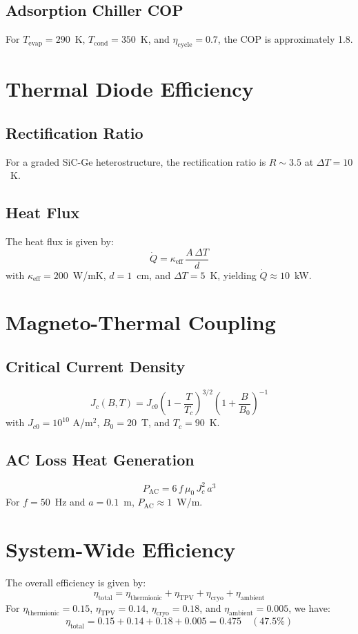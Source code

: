\documentclass[12pt]{article}
\begin{document}
\subsection{Adsorption Chiller COP}
For $T_{\text{evap}} = 290$~K, $T_{\text{cond}} = 350$~K, and $\eta_{\text{cycle}} = 0.7$, the COP is approximately 1.8.

\section{Thermal Diode Efficiency}
\subsection{Rectification Ratio}
For a graded SiC-Ge heterostructure, the rectification ratio is $R \sim 3.5$ at $\Delta T = 10$~K.

\subsection{Heat Flux}
The heat flux is given by:
\begin{equation}
    \dot{Q} = \kappa_{\text{eff}}\,\frac{A\,\Delta T}{d}
\end{equation}
with $\kappa_{\text{eff}} = 200$~W/mK, $d = 1$~cm, and $\Delta T = 5$~K, yielding $\dot{Q} \approx 10$~kW.

\section{Magneto-Thermal Coupling}
\subsection{Critical Current Density}
\begin{equation}
    J_c(B,T) = J_{c0}\left(1 - \frac{T}{T_c}\right)^{3/2}\left(1 + \frac{B}{B_0}\right)^{-1}
\end{equation}
with $J_{c0} = 10^{10}$ A/m$^2$, $B_0 = 20$~T, and $T_c = 90$~K.

\subsection{AC Loss Heat Generation}
\begin{equation}
    P_{\text{AC}} = 6\,f\,\mu_0\,J_c^2\,a^3
\end{equation}
For $f = 50$~Hz and $a = 0.1$~m, $P_{\text{AC}} \approx 1$~W/m.

\section{System-Wide Efficiency}
The overall efficiency is given by:
\begin{equation}
    \eta_{\text{total}} = \eta_{\text{thermionic}} + \eta_{\text{TPV}} + \eta_{\text{cryo}} + \eta_{\text{ambient}}
\end{equation}
For $\eta_{\text{thermionic}} = 0.15$, $\eta_{\text{TPV}} = 0.14$, $\eta_{\text{cryo}} = 0.18$, and $\eta_{\text{ambient}} = 0.005$, we have:
\[
\eta_{\text{total}} = 0.15 + 0.14 + 0.18 + 0.005 = 0.475 \quad (47.5\%)
\]
\end{document}
